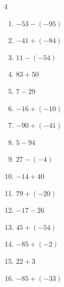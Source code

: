 \begin{multicols}{4}
\begin{enumerate}
  \item $-53-(-95)$

        \phantom{$=42$}

  \item $-41+(-84)$

        \phantom{$=-125$}

\columnbreak %

  \item $11-(-54)$

        \phantom{$=65$}

  \item $83+50$

        \phantom{$=133$}

  \item $7-29$

        \phantom{$=-22$}

  \item $-16+(-10)$

        \phantom{$=-26$}

  \item $-90+(-41)$

        \phantom{$=-131$}

  \item $5-94$

        \phantom{$=-89$}

  \item $27-(-4)$

        \phantom{$=31$}

  \item $-14+40$

        \phantom{$=26$}

  \item $79+(-20)$

        \phantom{$=59$}

  \item $-17-26$

        \phantom{$=-43$}

  \item $45+(-54)$

        \phantom{$=-9$}

  \item $-85+(-2)$

        \phantom{$=-87$}

  \item $22+3$

        \phantom{$=25$}

  \item $-85+(-33)$


\end{enumerate}
\end{multicols}
